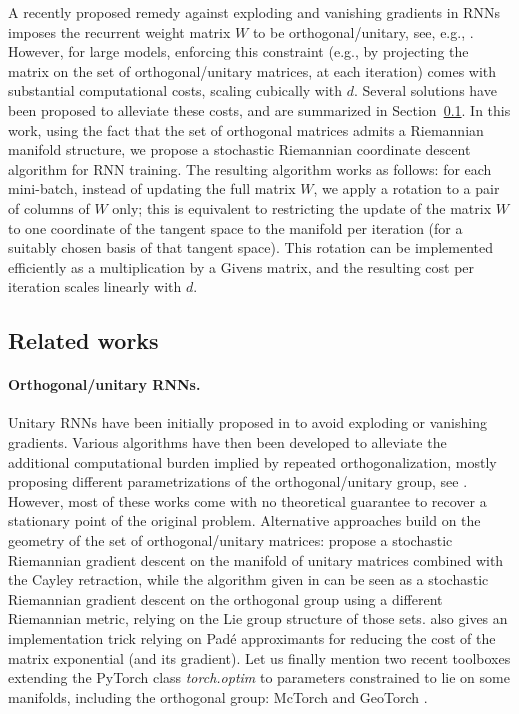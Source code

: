 \documentclass{article}
\begin{document}
A recently proposed remedy against exploding and vanishing gradients in RNNs imposes the recurrent weight matrix $W$ to be orthogonal/unitary, see, e.g., \cite{Arjovsky2016}. However, for large models, enforcing this constraint (e.g., by projecting the matrix on the set of orthogonal/unitary matrices, at each iteration) comes with substantial computational costs, scaling cubically with $d$. Several solutions have been proposed to alleviate these costs, and are summarized in Section~\ref{sec:background}. In this work, using the fact that the set of orthogonal matrices admits a Riemannian manifold structure, we propose a stochastic Riemannian coordinate descent algorithm for RNN training. The resulting algorithm works as follows: for each mini-batch, instead of updating the full matrix $W$, we apply a rotation to a pair of columns of $W$ only; this is equivalent to restricting the update of the matrix $W$ to one coordinate of the tangent space to the manifold per iteration (for a suitably chosen basis of that tangent space). This rotation can be implemented efficiently as a multiplication by a Givens matrix, and the resulting cost per iteration scales linearly with $d$. 

\subsection{Related works}
\label{sec:background}
\paragraph{Orthogonal/unitary RNNs.}  Unitary RNNs have been initially proposed in \cite{Arjovsky2016} to avoid exploding or vanishing gradients. Various algorithms have then been developed to alleviate the additional computational burden implied by repeated orthogonalization, mostly proposing different parametrizations of the orthogonal/unitary group, see \cite{Arjovsky2016,Wisdom2016,Jing2017,Hyland2017,Mhammedi2017,Helfrich2018, Maduranga2019, Lezcano2019}. However, most of these works come with no theoretical guarantee to recover a stationary point of the original problem. Alternative approaches build on the geometry of the set of orthogonal/unitary matrices: \cite{Wisdom2016} propose a stochastic Riemannian gradient descent on the manifold of unitary matrices combined with the Cayley retraction, while the algorithm given in \cite{Lezcano2019} can be seen as a stochastic Riemannian gradient descent on the orthogonal group using a different Riemannian metric, relying on the Lie group structure of those sets. \cite{Lezcano2019} also gives an implementation trick relying on Pad\'e approximants for reducing the cost of the matrix exponential (and its gradient). Let us finally mention two recent toolboxes extending the PyTorch class \emph{torch.optim} to parameters constrained to lie on some manifolds, including the orthogonal group: McTorch \cite{Mctorch} and GeoTorch \cite{lezcano2019trivializations}. 
\end{document}
